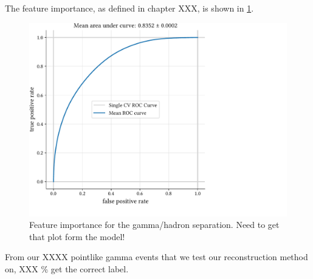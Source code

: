 The feature importance, as defined in chapter XXX, is shown in \ref{fig:gh_features}.
\begin{figure}
    \centering
    \includegraphics[page=1, width=.8\textwidth]{../analysis/plots/cross_val_sep_perf_plot.pdf}
    \caption{Feature importance for the gamma/hadron separation. Need to get that plot form the model!}
    \label{fig:gh_features}
\end{figure}


From our XXXX pointlike gamma events that we test our reconstruction method on, 
XXX \% get the correct label.
